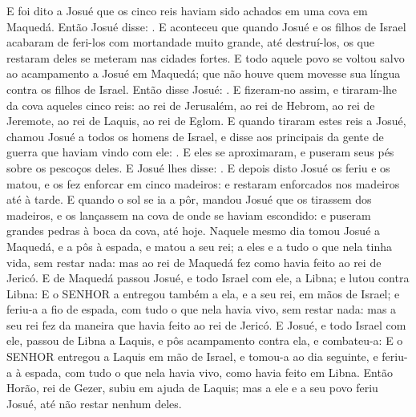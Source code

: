 {E foi dito a Josué que os cinco reis haviam sido achados em uma cova em Maquedá.
Então Josué disse: .
E aconteceu que quando Josué e os filhos de Israel acabaram de feri-los com mortandade muito grande, até destruí-los, os que restaram deles se meteram nas cidades fortes.
E todo aquele povo se voltou salvo ao acampamento a Josué em Maquedá; que não houve quem movesse sua língua contra os filhos de Israel.
Então disse Josué: .
E fizeram-no assim, e tiraram-lhe da cova aqueles cinco reis: ao rei de Jerusalém, ao rei de Hebrom, ao rei de Jeremote, ao rei de Laquis, ao rei de Eglom.
E quando tiraram estes reis a Josué, chamou Josué a todos os homens de Israel, e disse aos principais da gente de guerra que haviam vindo com ele: . E eles se aproximaram, e puseram seus pés sobre os pescoços deles.
E Josué lhes disse: .
E depois disto Josué os feriu e os matou, e os fez enforcar em cinco madeiros: e restaram enforcados nos madeiros até à tarde.
E quando o sol se ia a pôr, mandou Josué que os tirassem dos madeiros, e os lançassem na cova de onde se haviam escondido: e puseram grandes pedras à boca da cova, até hoje.
Naquele mesmo dia tomou Josué a Maquedá, e a pôs à espada, e matou a seu rei; a eles e a tudo o que nela tinha vida, sem restar nada: mas ao rei de Maquedá fez como havia feito ao rei de Jericó.
E de Maquedá passou Josué, e todo Israel com ele, a Libna; e lutou contra Libna:
E o SENHOR a entregou também a ela, e a seu rei, em mãos de Israel; e feriu-a a fio de espada, com tudo o que nela havia vivo, sem restar nada: mas a seu rei fez da maneira que havia feito ao rei de Jericó.
E Josué, e todo Israel com ele, passou de Libna a Laquis, e pôs acampamento contra ela, e combateu-a:
E o SENHOR entregou a Laquis em mão de Israel, e tomou-a ao dia seguinte, e feriu-a à espada, com tudo o que nela havia vivo, como havia feito em Libna.
Então Horão, rei de Gezer, subiu em ajuda de Laquis; mas a ele e a seu povo feriu Josué, até não restar nenhum deles.
}
